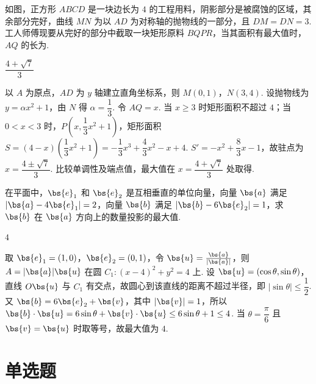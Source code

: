 \documentclass[UTF8,a4paper,oneside,11pt]{ctexbook}
\begin{document}
\begin{problem}
如图，正方形 \(ABCD\) 是一块边长为 \(4\) 的工程用料，阴影部分是被腐蚀的区域，其余部分完好，曲线 \(MN\) 为以 \(AD\) 为对称轴的抛物线的一部分，且 \(DM=DN=3\). 工人师傅现要从完好的部分中截取一块矩形原料 \(BQPR\)，当其面积有最大值时，\(AQ\) 的长为\fillinblank{}.

\end{problem}

\begin{answer}
\(\dfrac{4+\sqrt7}{3}\)
\end{answer}

\begin{solution}
以 \(A\) 为原点，\(AD\) 为 \(y\) 轴建立直角坐标系，则 \(M(0,1)\)，\(N(3,4)\). 设抛物线为 \(y=\alpha x^2+1\)，由 \(N\) 得 \(\alpha=\dfrac13\). 令 \(AQ=x\). 当 \(x\ge3\) 时矩形面积不超过 \(4\)；当 \(0<x<3\) 时，\(P\left(x,\dfrac13x^2+1\right)\)，矩形面积
\(S=(4-x)\left(\dfrac13x^2+1\right)=-\dfrac13x^3+\dfrac43x^2-x+4\).
\(S'=-x^2+\dfrac83x-1\)，故驻点为 \(x=\dfrac{4\pm\sqrt7}{3}\). 比较单调性及端点值，最大值在 \(x=\dfrac{4+\sqrt7}{3}\) 处取得.
\end{solution}

\begin{problem}
在平面中，\(\bs{e}_1\) 和 \(\bs{e}_2\) 是互相垂直的单位向量，向量 \(\bs{a}\) 满足 \(|\bs{a}-4\bs{e}_1|=2\)，向量 \(\bs{b}\) 满足 \(|\bs{b}-6\bs{e}_2|=1\)，求 \(\bs{b}\) 在 \(\bs{a}\) 方向上的数量投影的最大值\fillinblank{}.
\end{problem}

\begin{answer}
\(4\)
\end{answer}

\begin{solution}
取 \(\bs{e}_1=(1,0)\)，\(\bs{e}_2=(0,1)\)，令 \(\bs{u}=\frac{\bs{a}}{|\bs{a}|}\)，则 \(A=|\bs{a}|\bs{u}\) 在圆 \(C_1:(x-4)^2+y^2=4\) 上. 设 \(\bs{u}=(\cos\theta,\sin\theta)\)，直线 \(O\bs{u}\) 与 \(C_1\) 有交点，故圆心到该直线的距离不超过半径，即 \(|\sin\theta|\le\dfrac12\). 又 \(\bs{b}=6\bs{e}_2+\bs{v}\)，其中 \(|\bs{v}|=1\)，所以
\(\bs{b}\cdot\bs{u}=6\sin\theta+\bs{v}\cdot\bs{u}\le6\sin\theta+1\le4\).
当 \(\theta=\dfrac\pi6\) 且 \(\bs{v}=\bs{u}\) 时取等号，故最大值为 \(4\).
\end{solution}

\section{单选题}
\end{document}
